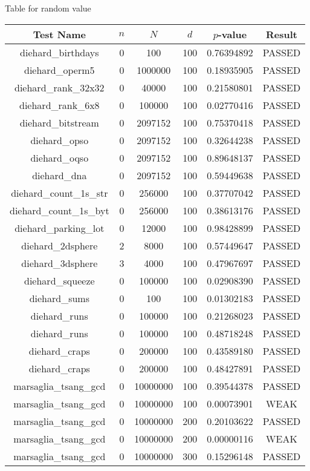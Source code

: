 Table for random value
\begin{longtable}{cccccc}
\toprule
Test Name & $n$ & $N$ & $d$ & $p$-value & Result \\
\midrule
\endhead
diehard\_birthdays & 0 & 100 & 100 & 0.76394892 & PASSED \\
diehard\_operm5 & 0 & 1000000 & 100 & 0.18935905 & PASSED \\
diehard\_rank\_32x32 & 0 & 40000 & 100 & 0.21580801 & PASSED \\
diehard\_rank\_6x8 & 0 & 100000 & 100 & 0.02770416 & PASSED \\
diehard\_bitstream & 0 & 2097152 & 100 & 0.75370418 & PASSED \\
diehard\_opso & 0 & 2097152 & 100 & 0.32644238 & PASSED \\
diehard\_oqso & 0 & 2097152 & 100 & 0.89648137 & PASSED \\
diehard\_dna & 0 & 2097152 & 100 & 0.59449638 & PASSED \\
diehard\_count\_1s\_str & 0 & 256000 & 100 & 0.37707042 & PASSED \\
diehard\_count\_1s\_byt & 0 & 256000 & 100 & 0.38613176 & PASSED \\
diehard\_parking\_lot & 0 & 12000 & 100 & 0.98428899 & PASSED \\
diehard\_2dsphere & 2 & 8000 & 100 & 0.57449647 & PASSED \\
diehard\_3dsphere & 3 & 4000 & 100 & 0.47967697 & PASSED \\
diehard\_squeeze & 0 & 100000 & 100 & 0.02908390 & PASSED \\
diehard\_sums & 0 & 100 & 100 & 0.01302183 & PASSED \\
diehard\_runs & 0 & 100000 & 100 & 0.21268023 & PASSED \\
diehard\_runs & 0 & 100000 & 100 & 0.48718248 & PASSED \\
diehard\_craps & 0 & 200000 & 100 & 0.43589180 & PASSED \\
diehard\_craps & 0 & 200000 & 100 & 0.48427891 & PASSED \\
marsaglia\_tsang\_gcd & 0 & 10000000 & 100 & 0.39544378 & PASSED \\
marsaglia\_tsang\_gcd & 0 & 10000000 & 100 & 0.00073901 & WEAK \\
marsaglia\_tsang\_gcd & 0 & 10000000 & 200 & 0.20103622 & PASSED \\
marsaglia\_tsang\_gcd & 0 & 10000000 & 200 & 0.00000116 & WEAK \\
marsaglia\_tsang\_gcd & 0 & 10000000 & 300 & 0.15296148 & PASSED \\

\end{longtable}
